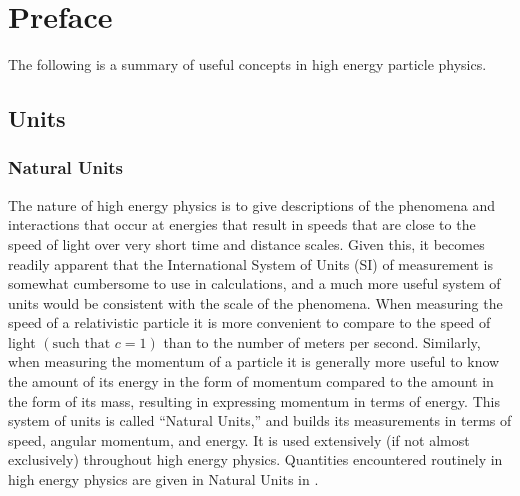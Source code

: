 \chapter*{Preface}\label{chapter:preface}

The following is a summary of useful concepts in high energy particle physics.

\section{Units}\label{section:units}

\subsection{Natural Units}\label{subsection:natural_units}

The nature of high energy physics is to give descriptions of the phenomena and interactions that occur at energies that result in speeds that are close to the speed of light over very short time and distance scales.
Given this, it becomes readily apparent that the International System of Units (SI) of measurement is somewhat cumbersome to use in calculations, and a much more useful system of units would be consistent with the scale of the phenomena.
When measuring the speed of a relativistic particle it is more convenient to compare to the speed of light $\left(\text{such that }c=1\right)$ than to the number of meters per second.
Similarly, when measuring the momentum of a particle it is generally more useful to know the amount of its energy in the form of momentum compared to the amount in the form of its mass, resulting in expressing momentum in terms of energy.
This system of units is called ``Natural Units,'' and builds its measurements in terms of speed, angular momentum, and energy.
It is used extensively (if not almost exclusively) throughout high energy physics.
Quantities encountered routinely in high energy physics are given in Natural Units in .
\clearpage

